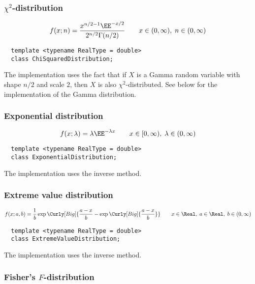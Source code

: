 \subsubsection{$\chi^2$-distribution}

\begin{equation*}
  f(x;n) = \frac{x^{n/2 - 1}\EE^{-x/2}}{2^{n/2}\Gamma(n/2)} \qquad
  x \in (0,\infty),\; n \in (0,\infty)
\end{equation*}
\begin{Verbatim}
  template <typename RealType = double>
  class ChiSquaredDistribution;
\end{Verbatim}
The implementation uses the fact that if $X$ is a Gamma random variable with
shape $n / 2$ and scale $2$, then $X$ is also $\chi^2$-distributed. See below
for the implementation of the Gamma distribution.

\subsubsection{Exponential distribution}

\begin{equation*}
  f(x;\lambda) = \lambda\EE^{-\lambda x} \qquad
  x \in [0,\infty),\; \lambda \in (0,\infty)
\end{equation*}
\begin{Verbatim}
  template <typename RealType = double>
  class ExponentialDistribution;
\end{Verbatim}
The implementation uses the inverse method.

\subsubsection{Extreme value distribution}

\begin{equation*}
  f(x;a,b) =
  \frac{1}{b}\exp\Curly[Big]{
    \frac{a - x}{b} - \exp\Curly[Big]{\frac{a - x}{b}}} \qquad
  x \in \Real,\; a \in \Real,\; b \in (0, \infty)
\end{equation*}
\begin{Verbatim}
  template <typename RealType = double>
  class ExtremeValueDistribution;
\end{Verbatim}
The implementation uses the inverse method.

\subsubsection{Fisher's $F$-distribution}


